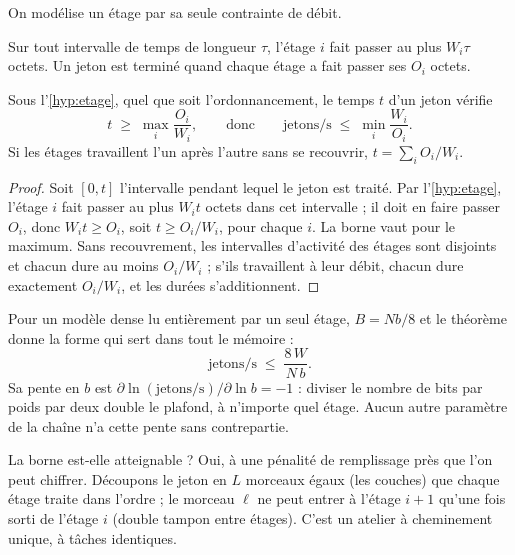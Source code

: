 On modélise un étage par sa seule contrainte de débit.

\begin{hypothese}\label{hyp:etage}
Sur tout intervalle de temps de longueur $\tau$, l'étage $i$ fait passer au plus $W_i \tau$ octets. Un jeton est terminé quand chaque étage a fait passer ses $O_i$ octets.
\end{hypothese}

\begin{theoreme}\label{thm:toit}
Sous l'\cref{hyp:etage}, quel que soit l'ordonnancement, le temps $t$ d'un jeton vérifie
\begin{equation}\label{eq:toit}
t \;\ge\; \max_i \frac{O_i}{W_i}, \qquad \text{donc} \qquad \text{jetons/s} \;\le\; \min_i \frac{W_i}{O_i}.
\end{equation}
Si les étages travaillent l'un après l'autre sans se recouvrir, $t = \sum_i O_i / W_i$.
\end{theoreme}

\begin{proof}
Soit $[0, t]$ l'intervalle pendant lequel le jeton est traité. Par l'\cref{hyp:etage}, l'étage $i$ fait passer au plus $W_i t$ octets dans cet intervalle ; il doit en faire passer $O_i$, donc $W_i t \ge O_i$, soit $t \ge O_i/W_i$, pour chaque $i$. La borne vaut pour le maximum. Sans recouvrement, les intervalles d'activité des étages sont disjoints et chacun dure au moins $O_i/W_i$ ; s'ils travaillent à leur débit, chacun dure exactement $O_i/W_i$, et les durées s'additionnent.
\end{proof}

Pour un modèle dense lu entièrement par un seul étage, $B = N b / 8$ et le théorème donne la forme qui sert dans tout le mémoire :
\begin{equation}\label{eq:toit-dense}
\text{jetons/s} \;\le\; \frac{8\, W}{N\, b}.
\end{equation}
Sa pente en $b$ est $\partial \ln(\text{jetons/s}) / \partial \ln b = -1$ : diviser le nombre de bits par poids par deux double le plafond, à n'importe quel étage. Aucun autre paramètre de la chaîne n'a cette pente sans contrepartie.

La borne est-elle atteignable ? Oui, à une pénalité de remplissage près que l'on peut chiffrer. Découpons le jeton en $L$ morceaux égaux (les couches) que chaque étage traite dans l'ordre ; le morceau $\ell$ ne peut entrer à l'étage $i+1$ qu'une fois sorti de l'étage $i$ (double tampon entre étages). C'est un atelier à cheminement unique, à tâches identiques.

